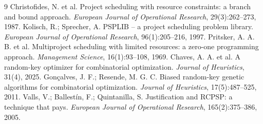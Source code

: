 \documentclass[11pt,a4paper]{article}
\begin{document}
\vspace{-0.6em}
{\scriptsize
\renewcommand{\refname}{\normalsize Referências}
\begin{thebibliography}{9}\setlength{\itemsep}{0pt}
 Christofides, N. et al. Project scheduling with resource constraints: a branch and bound approach. \emph{European Journal of Operational Research}, 29(3):262--273, 1987.
 Kolisch, R.; Sprecher, A. PSPLIB -- a project scheduling problem library. \emph{European Journal of Operational Research}, 96(1):205--216, 1997.
 Pritsker, A. A. B. et al. Multiproject scheduling with limited resources: a zero-one programming approach. \emph{Management Science}, 16(1):93--108, 1969.
 Chaves, A. A. et al. A random-key optimizer for combinatorial optimization. \emph{Journal of Heuristics}, 31(4), 2025.
 Gonçalves, J. F.; Resende, M. G. C. Biased random-key genetic algorithms for combinatorial optimization. \emph{Journal of Heuristics}, 17(5):487--525, 2011.
 Valls, V.; Ballestín, F.; Quintanilla, S. Justification and RCPSP: a technique that pays. \emph{European Journal of Operational Research}, 165(2):375--386, 2005.
\end{thebibliography}}
\end{document}
